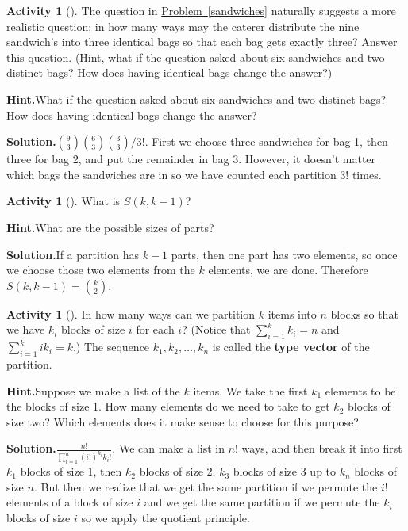 \documentclass[10pt,]{book}
\newcommand{\terminology}[1]{\textbf{#1}}
\theoremstyle{plain}
\theoremstyle{definition}
\newtheorem{activity}[project]{Activity}
\numberwithin{equation}{chapter}
\begin{document}
\begin{activity}[]\label{activity-127}
The question in \hyperref[sandwiches]{Problem~\ref{sandwiches}} naturally suggests a more realistic question; in how many ways may the caterer distribute the nine sandwich's into three identical bags so that each bag gets exactly three? Answer this question. (Hint, what if the question asked about six sandwiches and two distinct bags? How does having identical bags change the answer?)%
\par\medskip\noindent%
\textbf{Hint.}\quad What if the question asked about six sandwiches and two distinct bags? How does having identical bags change the answer?%
\par\medskip\noindent%
\textbf{Solution.}\quad \(\binom{9}{3}\binom{6}{3}\binom{3}{3}/3!\). First we choose three sandwiches for bag 1, then three for bag 2, and put the remainder in bag 3. However, it doesn't matter which bags the sandwiches are in so we have counted each partition \(3!\) times.%
\end{activity}
\begin{activity}[]\label{activity-128}
What is \(S(k,k-1)\)?%
\par\medskip\noindent%
\textbf{Hint.}\quad What are the possible sizes of parts?%
\par\medskip\noindent%
\textbf{Solution.}\quad If a partition has \(k-1\) parts, then one part has two elements, so once we choose those two elements from the \(k\) elements, we are done.  Therefore \(S(k,k-1) = \binom{k}{2}\).%
\end{activity}
\begin{activity}[]\label{partitionsgivenpartsize}
In how many ways can we partition \(k\) items into \(n\) blocks so that we have \(k_i\) blocks of size \(i\) for each \(i\)? (Notice that \(\sum_{i=1}^k k_i = n\) and \(\sum_{i=1}^k ik_i = k\).) The sequence \(k_1,k_2,\ldots,k_n\) is called the \terminology{type vector} of the partition.%
\par\medskip\noindent%
\textbf{Hint.}\quad Suppose we make a list of the \(k\) items. We take the first \(k_1\) elements to be the blocks of size 1. How many elements do we need to take to get \(k_2\) blocks of size two? Which elements does it make sense to choose for this purpose?%
\par\medskip\noindent%
\textbf{Solution.}\quad \(\frac{n!}{\prod_{i=1}^n (i!)^{k_i}{k_i!}}\). We can make a list in \(n!\) ways, and then break it into first \(k_1\) blocks of size 1, then \(k_2\) blocks of size 2, \(k_3\) blocks of size 3 up to \(k_n\) blocks of size \(n\). But then we realize that we get the same partition if we permute the \(i!\) elements of a block of size \(i\) and we get the same partition if we permute the \(k_i\) blocks of size \(i\) so we apply the quotient principle.%
\end{activity}
\end{document}
